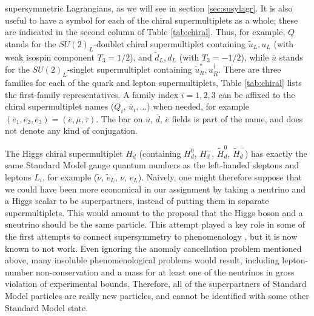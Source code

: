 \documentclass[11pt]{article}
\def\sbar{\overline}
\def\stilde{\widetilde}
\begin{document}
supersymmetric Lagrangians, as we will see in section \ref{sec:susylagr}.
It is also useful to have a symbol for each of the chiral supermultiplets
as a whole; these are indicated in the second column of 
Table \ref{tab:chiral}. Thus, for
example, $Q$ stands for the $SU(2)_L$-doublet chiral supermultiplet
containing $\stilde u_L,u_L$ (with weak isospin component $T_3=1/2$), and
$\stilde d_L, d_L$ (with $T_3=-1/2$), while $\sbar u$ stands for the
$SU(2)_L$-singlet supermultiplet containing $\stilde u_R^*, u_R^\dagger$.
There are three families for each of the quark and lepton supermultiplets,
Table \ref{tab:chiral} lists the first-family representatives. A family
index $i=1,2,3$ can be affixed to the chiral supermultiplet names ($Q_i$,
$\sbar u_i, \ldots$) when needed, for example 
$(\sbar e_1, \sbar e_2, \sbar e_3)=
(\sbar e, \sbar \mu, \sbar \tau)$. The bar on $\sbar u$, $\sbar d$, $\sbar
e$ fields is part of the name, and does not denote any kind of
conjugation. 

The Higgs chiral supermultiplet $H_d$
(containing $H_d^0$, $H_d^-$, $\stilde H_d^0$, $\stilde H_d^-$) has
exactly the same Standard Model gauge quantum numbers as the left-handed
sleptons and leptons $L_i$, for example ($\stilde \nu$, $\stilde e_L$, $\nu$,
$e_L$). Naively, one might therefore suppose that we could have been more
economical in our assignment by taking a neutrino and a Higgs scalar to be
superpartners, instead of putting them in separate supermultiplets. This
would amount to the proposal that the Higgs boson and a sneutrino should
be the same particle. This attempt played a key role in some of the first
attempts to connect supersymmetry to phenomenology \cite{FayetHsnu}, but
it is now known to not work. Even ignoring the anomaly cancellation
problem mentioned above, many insoluble phenomenological problems would
result, including lepton-number non-conservation and a mass for at least
one of the neutrinos in gross violation of experimental bounds. Therefore,
all of the superpartners of Standard Model particles are really new
particles, and cannot be identified with some other Standard Model state. 
\end{document}
